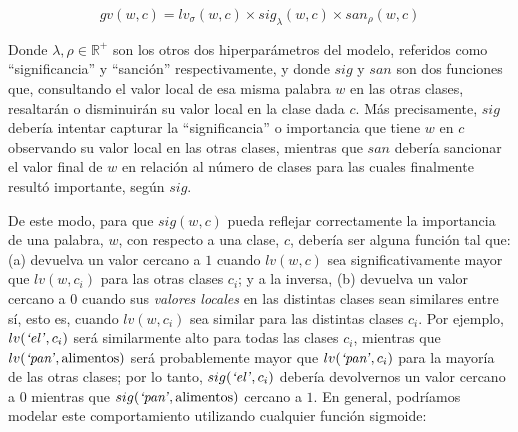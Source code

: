 \begin{equation}
gv(w, c) = lv_\sigma(w, c)\times sig_{\lambda}(w, c)\times san_\rho(w, c)
\label{eq:gv}
\end{equation}

Donde $\lambda, \rho \in \mathbb{R}^+$ son los otros dos hiperparámetros del modelo, referidos como ``significancia'' y ``sanción'' respectivamente, y donde $sig$ y $san$ son dos funciones que, consultando el valor local de esa misma palabra $w$ en las otras clases, resaltarán o disminuirán su valor local en la clase dada $c$.
Más precisamente, $sig$ debería intentar capturar la ``significancia'' o importancia que tiene $w$ en $c$ observando su valor local en las otras clases, mientras que $san$ debería sancionar el valor final de $w$ en relación al número de clases para las cuales finalmente resultó importante, según $sig$.

\vspace{5mm}

De este modo, para que $sig(w, c)$ pueda reflejar correctamente la importancia de una palabra, $w$, con respecto a una clase, $c$, debería ser alguna función tal que:
(a) devuelva un valor cercano a $1$ cuando $lv(w, c)$ sea significativamente mayor que $lv(w, c_i)$ para las otras clases $c_i$; y a la inversa,
(b) devuelva un valor cercano a $0$ cuando sus \emph{valores locales} en las distintas clases sean similares entre sí, esto es, cuando $lv(w, c_i)$ sea similar para las distintas clases $c_i$.
Por ejemplo, $lv(\text{\emph{`el'}},c_i)$ será similarmente alto para todas las clases $c_i$, mientras que $lv(\text{\emph{`pan'}}, \text{alimentos})$ será probablemente mayor que $lv(\text{\emph{`pan'}}, c_i)$ para la mayoría de las otras clases; por lo tanto, $sig(\text{\emph{`el'}},c_i)$ debería devolvernos un valor cercano a $0$ mientras que $sig(\text{\emph{`pan'}}, \text{alimentos})$ cercano a $1$.
En general, podríamos modelar este comportamiento utilizando cualquier función sigmoide:


